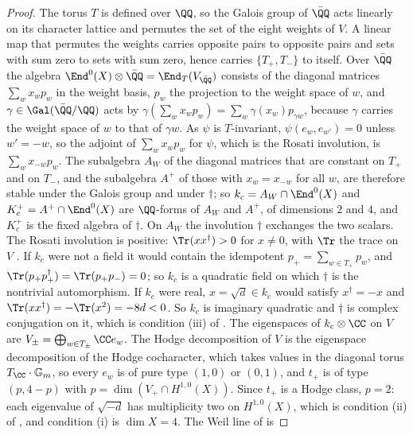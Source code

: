\begin{proof}
The torus $T$ is defined over $\QQ$, so the Galois group of $\bar{\QQ}$ acts
linearly on its character lattice and permutes the set of the eight weights
of $V$. A linear map that permutes the weights carries opposite pairs to
opposite pairs and sets with sum zero to sets with sum zero, hence carries
$\{T_{+},T_{-}\}$ to itself. Over $\bar{\QQ}$ the algebra
$\End^{0}(X)\otimes\bar{\QQ}=\End_{T}(V_{\bar{\QQ}})$ consists of the
diagonal matrices $\sum_{w}x_{w}p_{w}$ in the weight basis, $p_{w}$ the
projection to the weight space of $w$, and $\gamma\in\Gal(\bar{\QQ}/\QQ)$
acts by $\gamma(\sum_{w}x_{w}p_{w})=\sum_{w}\gamma(x_{w})p_{\gamma w}$,
because $\gamma$ carries the weight space of $w$ to that of $\gamma w$. As
$\psi$ is $T$-invariant, $\psi(e_{w},e_{w'})=0$ unless $w'=-w$, so the
adjoint of $\sum_{w}x_{w}p_{w}$ for $\psi$, which is the Rosati involution,
is $\sum_{w}x_{-w}p_{w}$. The subalgebra $A_{W}$ of the diagonal matrices
that are constant on $T_{+}$ and on $T_{-}$, and the subalgebra $A^{+}$ of
those with $x_{w}=x_{-w}$ for all $w$, are therefore stable under the Galois
group and under $\dagger$; so $k_{c}=A_{W}\cap\End^{0}(X)$ and
$K_{c}^{+}=A^{+}\cap\End^{0}(X)$ are $\QQ$-forms of $A_{W}$ and $A^{+}$, of
dimensions $2$ and $4$, and $K_{c}^{+}$ is the fixed algebra of $\dagger$.
On $A_{W}$ the involution $\dagger$ exchanges the two scalars. The Rosati
involution is positive: $\Tr(xx^{\dagger})>0$ for $x\ne0$, with $\Tr$ the
trace on $V$ \cite[Section~5.1]{BL04}. If $k_{c}$ were not a field it would
contain the idempotent $p_{+}=\sum_{w\in T_{+}}p_{w}$, and
$\Tr(p_{+}p_{+}^{\dagger})=\Tr(p_{+}p_{-})=0$; so $k_{c}$ is a quadratic
field on which $\dagger$ is the nontrivial automorphism. If $k_{c}$ were
real, $x=\sqrt{d}\in k_{c}$ would satisfy $x^{\dagger}=-x$ and
$\Tr(xx^{\dagger})=-\Tr(x^{2})=-8d<0$. So $k_{c}$ is imaginary quadratic and
$\dagger$ is complex conjugation on it, which is condition (iii) of
\cite[Definition~3.1]{paperI}. The eigenspaces of $k_{c}\otimes\CC$ on $V$ are
$V_{\pm}=\bigoplus_{w\in T_{\pm}}\CC e_{w}$. The Hodge decomposition of $V$
is the eigenspace decomposition of the Hodge cocharacter, which takes values
in the diagonal torus $T_{\CC}\cdot\mathbb{G}_{m}$, so every $e_{w}$ is of
pure type $(1,0)$ or $(0,1)$, and $t_{+}$ is of type $(p,4-p)$ with
$p=\dim(V_{+}\cap H^{1,0}(X))$. Since $t_{+}$ is a Hodge class, $p=2$: each
eigenvalue of $\sqrt{-d}$ has multiplicity two on $H^{1,0}(X)$, which is
condition (ii) of \cite[Definition~3.1]{paperI}, and condition (i) is $\dim X=4$. The
Weil line of \cite[Definition~3.6]{paperI} is

\end{proof}
